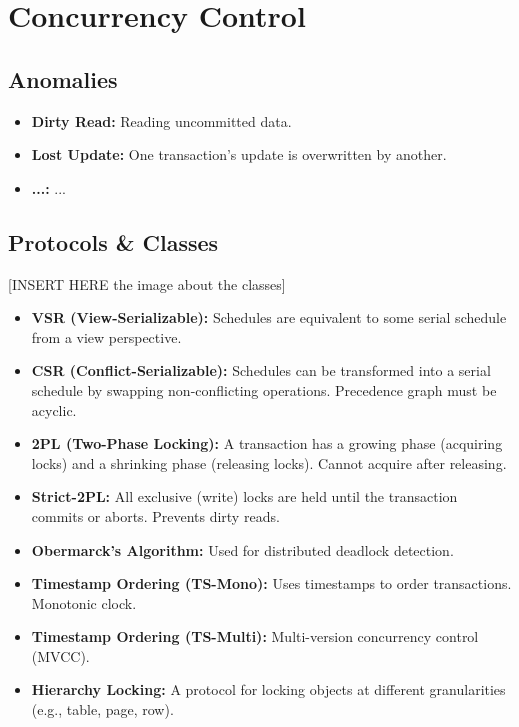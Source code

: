
\section*{Concurrency Control}

\subsection*{Anomalies}
\begin{itemize}
    \item \textbf{Dirty Read:} Reading uncommitted data.
    \item \textbf{Lost Update:} One transaction's update is overwritten by another.
    \item \textbf{...:} ...
\end{itemize}

\subsection*{Protocols \& Classes}
[INSERT HERE the image about the classes]
\begin{itemize}
    \item \textbf{VSR (View-Serializable):} Schedules are equivalent to some serial schedule from a view perspective.
    \item \textbf{CSR (Conflict-Serializable):} Schedules can be transformed into a serial schedule by swapping non-conflicting operations. Precedence graph must be acyclic.
    \item \textbf{2PL (Two-Phase Locking):} A transaction has a growing phase (acquiring locks) and a shrinking phase (releasing locks). Cannot acquire after releasing.
    \item \textbf{Strict-2PL:} All exclusive (write) locks are held until the transaction commits or aborts. Prevents dirty reads.
    \item \textbf{Obermarck's Algorithm:} Used for distributed deadlock detection.
    \item \textbf{Timestamp Ordering (TS-Mono):} Uses timestamps to order transactions. Monotonic clock.
    \item \textbf{Timestamp Ordering (TS-Multi):} Multi-version concurrency control (MVCC).
    \item \textbf{Hierarchy Locking:} A protocol for locking objects at different granularities (e.g., table, page, row).
\end{itemize}

